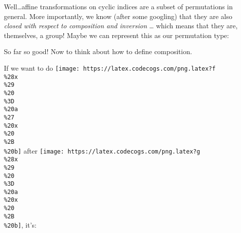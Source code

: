 \documentclass[]{article}
\newenvironment{Shaded}{}{}
\newcommand{\DataTypeTok}[1]{\textcolor[rgb]{0.56,0.13,0.00}{#1}}
\newcommand{\DecValTok}[1]{\textcolor[rgb]{0.25,0.63,0.44}{#1}}
\newcommand{\FunctionTok}[1]{\textcolor[rgb]{0.02,0.16,0.49}{#1}}
\newcommand{\KeywordTok}[1]{\textcolor[rgb]{0.00,0.44,0.13}{\textbf{#1}}}
\newcommand{\NormalTok}[1]{#1}
\newcommand{\OperatorTok}[1]{\textcolor[rgb]{0.40,0.40,0.40}{#1}}
\newcommand{\OtherTok}[1]{\textcolor[rgb]{0.00,0.44,0.13}{#1}}
\newcommand{\StringTok}[1]{\textcolor[rgb]{0.25,0.44,0.63}{#1}}
\begin{document}
Well\ldots affine transformations on cyclic indices are a subset of permutations
in general. More importantly, we know (after some googling) that they are also
\emph{closed with respect to composition and inversion} \ldots{} which means
that they are, themselves, a group! Maybe we can represent this as our
permutation type:

\begin{Shaded}
\end{Shaded}

So far so good! Now to think about how to define composition.

If we want to do
\texttt{[image: https://latex.codecogs.com/png.latex?f\\\%28x\\\%29\\\%20\\\%3D\\\%20a\\\%27\\\%20x\\\%20\\\%2B\\\%20b]}
after
\texttt{[image: https://latex.codecogs.com/png.latex?g\\\%28x\\\%29\\\%20\\\%3D\\\%20a\\\%20x\\\%20\\\%2B\\\%20b]},
it's:
\end{document}
